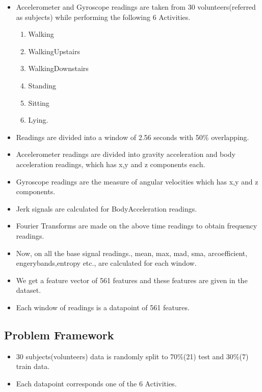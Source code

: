 \documentclass[11pt]{article}
\providecommand{\tightlist}{%
      \setlength{\itemsep}{0pt}\setlength{\parskip}{0pt}}
\begin{document}
    \begin{itemize}
\item
  Accelerometer and Gyroscope readings are taken from 30
  volunteers(referred as subjects) while performing the following 6
  Activities.

  \begin{enumerate}
  \def\labelenumi{\arabic{enumi}.}
  \tightlist
  \item
    Walking\\
  \item
    WalkingUpstairs
  \item
    WalkingDownstairs
  \item
    Standing
  \item
    Sitting
  \item
    Lying.
  \end{enumerate}
\item
  Readings are divided into a window of 2.56 seconds with 50\%
  overlapping.
\item
  Accelerometer readings are divided into gravity acceleration and body
  acceleration readings, which has x,y and z components each.
\item
  Gyroscope readings are the measure of angular velocities which has x,y
  and z components.
\item
  Jerk signals are calculated for BodyAcceleration readings.
\item
  Fourier Transforms are made on the above time readings to obtain
  frequency readings.
\item
  Now, on all the base signal readings., mean, max, mad, sma,
  arcoefficient, engerybands,entropy etc., are calculated for each
  window.
\item
  We get a feature vector of 561 features and these features are given
  in the dataset.
\item
  Each window of readings is a datapoint of 561 features.
\end{itemize}

\hypertarget{problem-framework}{%
\subsection{Problem Framework}\label{problem-framework}}

\begin{itemize}
\tightlist
\item
  30 subjects(volunteers) data is randomly split to 70\%(21) test and
  30\%(7) train data.
\item
  Each datapoint corresponds one of the 6 Activities.
\end{itemize}
\end{document}

